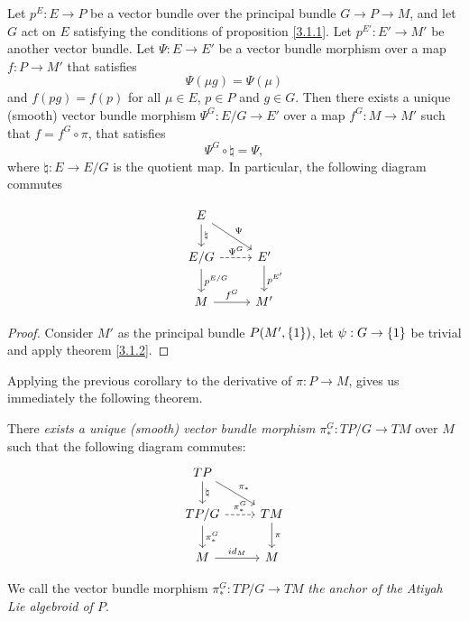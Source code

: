 \begin{corollary}
Let $p^E: E \to P$ be a vector bundle over the principal bundle $G \to P \to M$, and let $G$ act on $E$ satisfying the conditions of proposition \ref{3.1.1}. Let $p^{E'}:E' \to M'$ be another vector bundle. Let $\Psi: E \to E'$ be a vector bundle morphism over a map $f: P \to M'$ that satisfies \[\Psi(\mu g) = \Psi(\mu)\] and $f(pg) = f(p)$ for all $\mu \in E$, $p \in P$ and $g \in G$. Then there exists a unique (smooth) vector bundle morphism $\Psi^{G}: E/G \to E'$ over a map $f^{G}: M \to M'$ such that $f = f^{G} \circ \pi$, that satisfies \[\Psi^{G} \circ \natural = \Psi,\] where $\natural: E \to E/G$ is the quotient map. In particular, the following diagram commutes

\begin{equation} \label{anchorDiagram}
    \begin{tikzcd}
    E \arrow[]{d}{\natural} \arrow[]{dr}{\Psi}& \\
    E/G \arrow[dashed]{r}{\Psi^{G}} \arrow[]{d}{p^{E/G}}& E' \arrow[]{d}{p^{E'}} \\
    M \arrow[]{r}{f^{G}} & M'
    \end{tikzcd}
\end{equation}
\end{corollary}

\begin{proof}
Consider $M'$ as the principal bundle $P(M', \left\{ 1 \right\})$, let $\psi:G \to \left\{ 1 \right\}$ be trivial and apply theorem \ref{3.1.2}.
\end{proof}

Applying the previous corollary to the derivative of $\pi: P \to M$, gives us immediately the following theorem.

\begin{theorem}\label{anchorAtiyah}
There \emph{exists a unique (smooth) vector bundle morphism} $\pi_*^G: TP/G \to TM$ over $M$ such that the following diagram commutes:
\begin{equation} \label{anchorDiagram}
    \begin{tikzcd}
    TP \arrow[]{d}{\natural} \arrow[]{dr}{\pi_*}& \\
    TP/G \arrow[dashed]{r}{\pi^G_*} \arrow[]{d}{\pi_*^G}& TM \arrow[]{d}{\pi} \\
    M \arrow[]{r}{id_M} & M
    \end{tikzcd}
\end{equation}

We call the vector bundle morphism $\pi^G_*:TP/G \to TM$ \emph{the anchor of the Atiyah Lie algebroid of $P$}.
\end{theorem}

